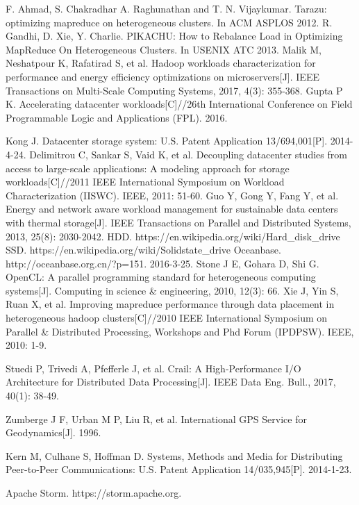 \documentclass[conference]{IEEEtran}
\begin{document}
\begin{thebibliography}{00}
 F. Ahmad, S. Chakradhar A. Raghunathan and T. N. Vijaykumar. Tarazu: optimizing mapreduce on heterogeneous clusters. In ACM ASPLOS 2012.
 R. Gandhi, D. Xie, Y. Charlie. PIKACHU: How to Rebalance Load in Optimizing MapReduce On Heterogeneous Clusters. In USENIX ATC 2013.
Malik M, Neshatpour K, Rafatirad S, et al. Hadoop workloads characterization for performance and energy efficiency optimizations on microservers[J]. IEEE Transactions on Multi-Scale Computing Systems, 2017, 4(3): 355-368.
Gupta P K. Accelerating datacenter workloads[C]//26th International Conference on Field Programmable Logic and Applications (FPL). 2016.

Kong J. Datacenter storage system: U.S. Patent Application 13/694,001[P]. 2014-4-24.
Delimitrou C, Sankar S, Vaid K, et al. Decoupling datacenter studies from access to large-scale applications: A modeling approach for storage workloads[C]//2011 IEEE International Symposium on Workload Characterization (IISWC). IEEE, 2011: 51-60.
Guo Y, Gong Y, Fang Y, et al. Energy and network aware workload management for sustainable data centers with thermal storage[J]. IEEE Transactions on Parallel and Distributed Systems, 2013, 25(8): 2030-2042.
 HDD. https://en.wikipedia.org/wiki/Hard\_disk\_drive
 SSD. https://en.wikipedia.org/wiki/Solid\-state\_drive
 Oceanbase. http://oceanbase.org.cn/?p=151. 2016-3-25.
Stone J E, Gohara D, Shi G. OpenCL: A parallel programming standard for heterogeneous computing systems[J]. Computing in science \& engineering, 2010, 12(3): 66.
Xie J, Yin S, Ruan X, et al. Improving mapreduce performance through data placement in heterogeneous hadoop clusters[C]//2010 IEEE International Symposium on Parallel \& Distributed Processing, Workshops and Phd Forum (IPDPSW). IEEE, 2010: 1-9.

Stuedi P, Trivedi A, Pfefferle J, et al. Crail: A High-Performance I/O Architecture for Distributed Data Processing[J]. IEEE Data Eng. Bull., 2017, 40(1): 38-49.

Zumberge J F, Urban M P, Liu R, et al. International GPS Service for Geodynamics[J]. 1996.

Kern M, Culhane S, Hoffman D. Systems, Methods and Media for Distributing Peer-to-Peer Communications: U.S. Patent Application 14/035,945[P]. 2014-1-23.


Apache Storm. https://storm.apache.org.


\end{thebibliography}
\end{document}
